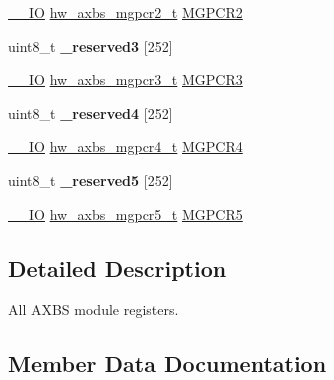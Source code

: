 \begin{DoxyCompactItemize}
\item 
\hyperlink{core__sc300_8h_aec43007d9998a0a0e01faede4133d6be}{\+\_\+\+\_\+\+IO} \hyperlink{union__hw__axbs__mgpcr2}{hw\+\_\+axbs\+\_\+mgpcr2\+\_\+t} \hyperlink{struct__hw__axbs_a3e2342e65da875aebfecd5e8bf869848}{M\+G\+P\+C\+R2}
\item 
uint8\+\_\+t {\bfseries \+\_\+reserved3} \mbox{[}252\mbox{]}\hypertarget{struct__hw__axbs_a029ac6ad8815d174b564e25bf647cf4f}{}\label{struct__hw__axbs_a029ac6ad8815d174b564e25bf647cf4f}

\item 
\hyperlink{core__sc300_8h_aec43007d9998a0a0e01faede4133d6be}{\+\_\+\+\_\+\+IO} \hyperlink{union__hw__axbs__mgpcr3}{hw\+\_\+axbs\+\_\+mgpcr3\+\_\+t} \hyperlink{struct__hw__axbs_af812926b79e3f6bdd48fdca5d893cf66}{M\+G\+P\+C\+R3}
\item 
uint8\+\_\+t {\bfseries \+\_\+reserved4} \mbox{[}252\mbox{]}\hypertarget{struct__hw__axbs_a6f171d157b617009c6f2a5f30441015e}{}\label{struct__hw__axbs_a6f171d157b617009c6f2a5f30441015e}

\item 
\hyperlink{core__sc300_8h_aec43007d9998a0a0e01faede4133d6be}{\+\_\+\+\_\+\+IO} \hyperlink{union__hw__axbs__mgpcr4}{hw\+\_\+axbs\+\_\+mgpcr4\+\_\+t} \hyperlink{struct__hw__axbs_a03bb66129841af192f7c9175c251308a}{M\+G\+P\+C\+R4}
\item 
uint8\+\_\+t {\bfseries \+\_\+reserved5} \mbox{[}252\mbox{]}\hypertarget{struct__hw__axbs_a9589fb9a5de3647bbba6de123896281d}{}\label{struct__hw__axbs_a9589fb9a5de3647bbba6de123896281d}

\item 
\hyperlink{core__sc300_8h_aec43007d9998a0a0e01faede4133d6be}{\+\_\+\+\_\+\+IO} \hyperlink{union__hw__axbs__mgpcr5}{hw\+\_\+axbs\+\_\+mgpcr5\+\_\+t} \hyperlink{struct__hw__axbs_a99d5ad7431d63b894a611da9f9b6876f}{M\+G\+P\+C\+R5}
\end{DoxyCompactItemize}


\subsection{Detailed Description}
All A\+X\+BS module registers. 

\subsection{Member Data Documentation}
